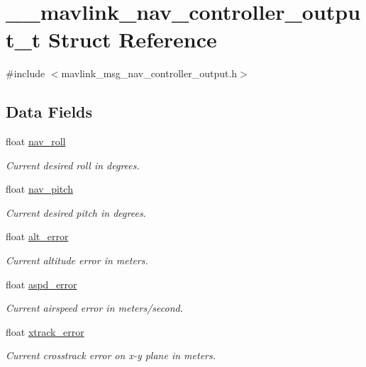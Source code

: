 \hypertarget{struct____mavlink__nav__controller__output__t}{\section{\+\_\+\+\_\+mavlink\+\_\+nav\+\_\+controller\+\_\+output\+\_\+t Struct Reference}
\label{struct____mavlink__nav__controller__output__t}
}


{\ttfamily \#include $<$mavlink\+\_\+msg\+\_\+nav\+\_\+controller\+\_\+output.\+h$>$}

\subsection*{Data Fields}
\begin{DoxyCompactItemize}
\item 
float \hyperlink{struct____mavlink__nav__controller__output__t_a4d11bb9b43d937ab389aab2982ddd1c1}{nav\+\_\+roll}
\begin{DoxyCompactList}\small\item\em Current desired roll in degrees. \end{DoxyCompactList}\item 
float \hyperlink{struct____mavlink__nav__controller__output__t_a12445c329084694f295b51a1f5587691}{nav\+\_\+pitch}
\begin{DoxyCompactList}\small\item\em Current desired pitch in degrees. \end{DoxyCompactList}\item 
float \hyperlink{struct____mavlink__nav__controller__output__t_a40a6a20a742864361b047967ce7eb9df}{alt\+\_\+error}
\begin{DoxyCompactList}\small\item\em Current altitude error in meters. \end{DoxyCompactList}\item 
float \hyperlink{struct____mavlink__nav__controller__output__t_af9d8faadd55533885c61717a7a7ac407}{aspd\+\_\+error}
\begin{DoxyCompactList}\small\item\em Current airspeed error in meters/second. \end{DoxyCompactList}\item 
float \hyperlink{struct____mavlink__nav__controller__output__t_a98cf3736cfd6f54d24effedb10b39cd0}{xtrack\+\_\+error}
\begin{DoxyCompactList}\small\item\em Current crosstrack error on x-\/y plane in meters. \end{DoxyCompactList}\item 

\end{DoxyCompactItemize}
